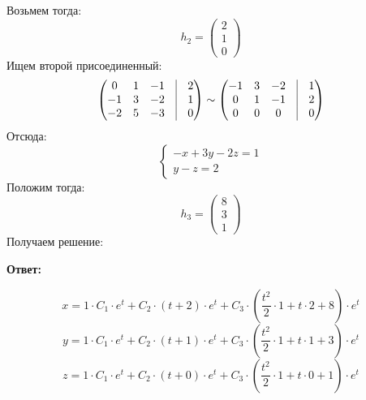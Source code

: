 \documentclass[a4paper,12pt]{article}
\begin{document}
Возьмем тогда:
\[
h_2 = \begin{pmatrix}
2 \\ 1\\ 0
\end{pmatrix}
\]
Ищем второй присоединенный:
\[
\begin{pmatrix}
0& 1 & -1 & \vrule & 2\\
-1 & 3& -2 & \vrule & 1\\
-2 &5 & -3  & \vrule & 0
\end{pmatrix}  \sim 
\begin{pmatrix}
-1& 3 & -2& \vrule & 1 \\
0 & 1& -1 & \vrule & 2\\
0 & 0 & 0 & \vrule & 0
\end{pmatrix}  
\]
Отсюда:
\[
\begin{cases}
-x + 3y - 2z = 1 \\
y - z = 2 
\end{cases}
\]
Положим тогда:
\[
h_3 = 
\begin{pmatrix}
8 \\
3 \\
1
\end{pmatrix}
\]
Получаем решение:
\begin{center}
\textbf{Ответ: } 
\end{center}
\[
x = 1 \cdot C_1 \cdot e^t + C_2 \cdot \left(t + 2\right) \cdot e^t + C_3 \cdot \left(\frac{t^2}{2} \cdot 1 + t \cdot 2 + 8\right) \cdot e^t
\]
\[
y = 1 \cdot C_1 \cdot e^t + C_2 \cdot \left(t + 1\right) \cdot e^t + C_3 \cdot \left(\frac{t^2}{2} \cdot 1 + t \cdot 1 + 3\right) \cdot e^t 
\]
\[
z = 1 \cdot C_1 \cdot e^t + C_2 \cdot \left(t + 0\right) \cdot e^t + C_3 \cdot \left(\frac{t^2}{2} \cdot 1 + t \cdot 0+ 1\right) \cdot e^t
\]
\clearpage
\end{document}

